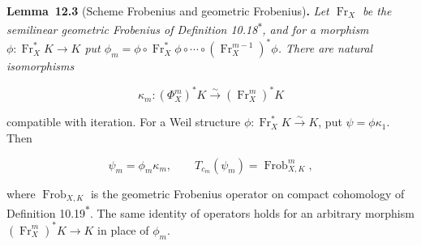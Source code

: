 \documentclass[11pt]{article}
\newenvironment{bpstatement}[2]{\par\addvspace{0.6\baselineskip}\noindent\textbf{#1}#2\textbf{.}\enspace\ignorespaces}
  {\par\addvspace{0.4\baselineskip}}
\newenvironment{bpstatementit}[2]{\begin{bpstatement}{#1}{#2}\itshape\ignorespaces}{\end{bpstatement}}
\newcommand{\bpout}[1]{#1\textsuperscript{\hyperlink{bp-outside}{\ensuremath{\ast}}}}
\begin{document}
\label{bp9}%
\begin{bpstatementit}{Lemma~12.3}{ (Scheme Frobenius and geometric Frobenius)}
Let \(\operatorname{Fr}_X\) be the semilinear geometric Frobenius of Definition \bpout{10.18}, and for a morphism \(\phi:\operatorname{Fr}_X^*K\to K\) put \(\phi_m=\phi\circ \operatorname{Fr}_X^*\phi\circ\cdots\circ(\operatorname{Fr}_X^{m-1})^*\phi\). There are natural isomorphisms

\[
\kappa_m:(\Phi_X^m)^*K\xrightarrow{\sim}(\operatorname{Fr}_X^m)^*K
\]

compatible with iteration. For a Weil structure \(\phi:\operatorname{Fr}_X^*K\xrightarrow{\sim}K\), put \(\psi=\phi\kappa_1\). Then

\[
\psi_m=\phi_m\kappa_m,
\qquad T_{c_m}(\psi_m)=\operatorname{Frob}_{X,K}^{m},
\]

where \(\operatorname{Frob}_{X,K}\) is the geometric Frobenius operator on compact cohomology of Definition \bpout{10.19}. The same identity of operators holds for an arbitrary morphism \((\operatorname{Fr}_X^m)^*K\to K\) in place of \(\phi_m\).
\end{bpstatementit}
\end{document}
